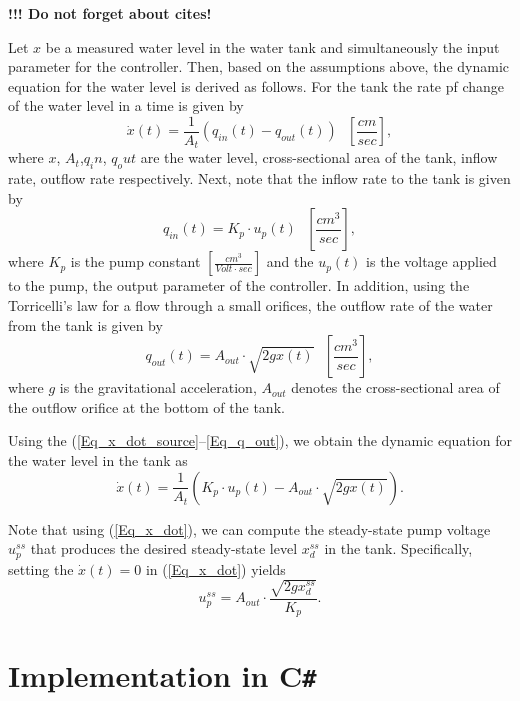 \documentclass{article}
\begin{document}
\textbf{\citep{simulator}!!! Do not forget about cites!}

Let $x$ be a measured water level in the water tank and simultaneously the input parameter for the controller.
Then, based on the assumptions above, the dynamic equation for the water level is derived as follows. 
For the tank the rate pf change of the water level in a time is given by
\begin{equation}
\label{Eq_x_dot_source}
\dot{x}(t)=\frac{1}{A_t}(q_{in}(t)-q_{out}(t))~~~\left [ \frac{cm}{sec} \right ],
\end{equation}
where $x$, $A_t$,$q_in$, $q_out$ are the water level, cross-sectional area of the tank, inflow rate, outflow rate respectively. Next, note that the inflow rate to the tank is given by
\begin{equation}
\label{Eq_q_in}
q_{in}(t)=K_p\cdot u_p(t)~~~\left [ \frac{cm^3}{sec} \right ],
\end{equation}
where $K_p$ is the pump constant $\left [ \frac{cm^3}{Volt \cdot sec} \right ]$ and the $u_p(t)$ is the voltage applied to the pump, the output parameter of the controller.
In addition, using the Torricelli's law for a flow through a small orifices, the outflow rate of the water from the tank is given by
\begin{equation}
\label{Eq_q_out}
q_{out}(t)=A_{out}\cdot\sqrt{2gx(t)}~~~\left [ \frac{cm^3}{sec} \right ],
\end{equation}
where $g$ is the gravitational acceleration, $A_{out}$ denotes the cross-sectional area of the outflow orifice at the bottom of the tank.

Using the (\ref{Eq_x_dot_source}--\ref{Eq_q_out}), we obtain the dynamic equation for the water level in the tank as
\begin{equation}
\label{Eq_x_dot}
\dot{x}(t)=\frac{1}{A_t}(K_p\cdot u_p(t)-A_{out}\cdot\sqrt{2gx(t)}).
\end{equation}

Note that using  (\ref{Eq_x_dot}), we can compute the steady-state pump voltage $u_p^{ss}$ that produces the desired steady-state level $x_d^{ss}$ in the tank. 
Specifically, setting the $\dot{x}(t)=0$ in (\ref{Eq_x_dot}) yields
\begin{equation}
\label{Eq_upss}
u_p^{ss}=A_{out} \cdot \frac{\sqrt{2g x_d^{ss}}}{K_p}.
\end{equation}

\section{Implementation in C\texttt{\#}}




\end{document}
